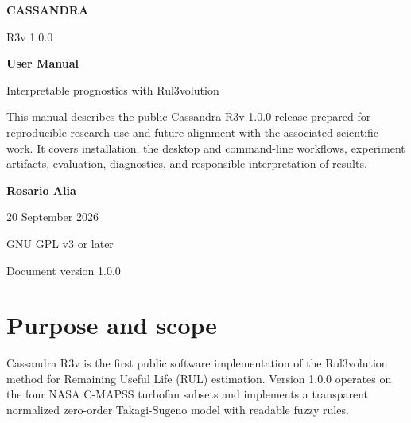 \documentclass[11pt,a4paper]{article}
\begin{document}

\begin{titlepage}
  \pagecolor{CassandraLight}
  \color{CassandraBlue}
  \vspace*{18mm}

  {\Huge\bfseries CASSANDRA\par}
  \vspace{3mm}
  {\Large R3v 1.0.0\par}
  \vspace{10mm}
  {\huge\bfseries User Manual\par}
  \vspace{4mm}
  {\Large Interpretable prognostics with Rul3volution\par}

  \vspace{16mm}
  \begin{tcolorbox}[
    colback=white,
    colframe=CassandraBlue,
    boxrule=1pt,
    arc=3pt,
    left=10pt,right=10pt,top=10pt,bottom=10pt
  ]
    \color{black}
    This manual describes the public Cassandra R3v 1.0.0 release prepared for
    reproducible research use and future alignment with the associated scientific work. It covers installation, the desktop and
    command-line workflows, experiment artifacts, evaluation, diagnostics,
    and responsible interpretation of results.
  \end{tcolorbox}

  \vfill
  {\large\bfseries Rosario Alia\par}
  \vspace{2mm}
  {\large 20 September 2026\par}
  \vspace{7mm}
  {\normalsize GNU GPL v3 or later\par}
  \vspace{3mm}
  {\small Document version 1.0.0\par}
\end{titlepage}
\nopagecolor
{}

\tableofcontents
\clearpage
{}

\section{Purpose and scope}

Cassandra R3v is the first public software implementation of the
Rul3volution method for Remaining Useful Life (RUL) estimation. Version 1.0.0
operates on the four NASA C-MAPSS turbofan subsets and implements a transparent
normalized zero-order Takagi-Sugeno model with readable fuzzy rules.
\end{document}
